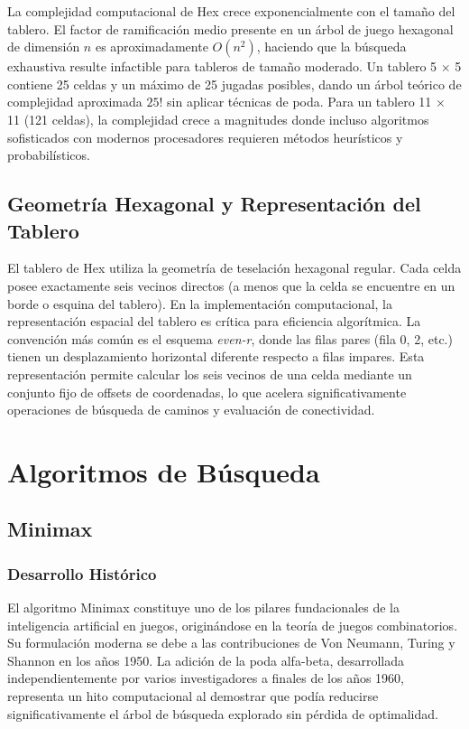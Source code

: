 \documentclass[12pt]{article}
\begin{document}
La complejidad computacional de Hex crece exponencialmente con el tamaño del tablero. El factor de ramificación medio presente en un árbol de juego hexagonal de dimensión $n$ es aproximadamente $O(n^2)$, haciendo que la búsqueda exhaustiva resulte infactible para tableros de tamaño moderado. Un tablero 5 × 5 contiene 25 celdas y un máximo de 25 jugadas posibles, dando un árbol teórico de complejidad aproximada $25!$ sin aplicar técnicas de poda. Para un tablero 11 × 11 (121 celdas), la complejidad crece a magnitudes donde incluso algoritmos sofisticados con modernos procesadores requieren métodos heurísticos y probabilísticos.

\subsection{Geometría Hexagonal y Representación del Tablero}

El tablero de Hex utiliza la geometría de teselación hexagonal regular. Cada celda posee exactamente seis vecinos directos (a menos que la celda se encuentre en un borde o esquina del tablero). En la implementación computacional, la representación espacial del tablero es crítica para eficiencia algorítmica. La convención más común es el esquema \textit{even-r}, donde las filas pares (fila 0, 2, etc.) tienen un desplazamiento horizontal diferente respecto a filas impares. Esta representación permite calcular los seis vecinos de una celda mediante un conjunto fijo de offsets de coordenadas, lo que acelera significativamente operaciones de búsqueda de caminos y evaluación de conectividad.

\section{Algoritmos de Búsqueda}

\subsection{Minimax}

\subsubsection{Desarrollo Histórico}

El algoritmo Minimax constituye uno de los pilares fundacionales de la inteligencia artificial en juegos, originándose en la teoría de juegos combinatorios. Su formulación moderna se debe a las contribuciones de Von Neumann, Turing y Shannon en los años 1950. La adición de la poda alfa-beta, desarrollada independientemente por varios investigadores a finales de los años 1960, representa un hito computacional al demostrar que podía reducirse significativamente el árbol de búsqueda explorado sin pérdida de optimalidad.
\end{document}
